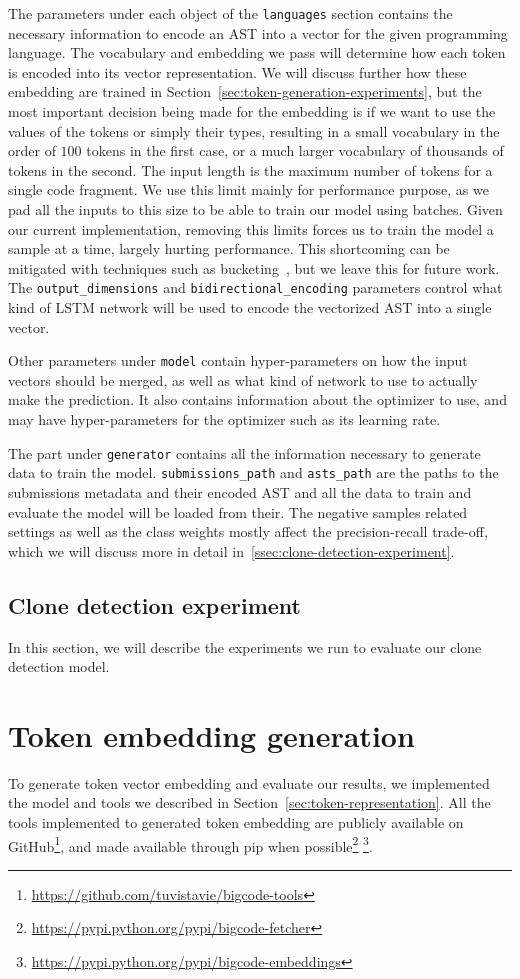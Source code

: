 The parameters under each object of the \lstinline{languages} section contains
the necessary information to encode an AST into a vector for the given
programming language. The vocabulary and embedding we pass will determine how
each token is encoded into its vector representation. We will discuss further
how these embedding are trained in
Section~\ref{sec:token-generation-experiments}, but the most important decision
being made for the embedding is if we want to use the values of the tokens or
simply their types, resulting in a small vocabulary in the order of $100$ tokens
in the first case, or a much larger vocabulary of thousands of tokens in the
second. The input length is the maximum number of tokens for a single code
fragment. We use this limit mainly for performance purpose, as we pad all the
inputs to this size to be able to train our model using batches. Given our
current implementation, removing this limits forces us to train the model a
sample at a time, largely hurting performance. This shortcoming can be mitigated
with techniques such as bucketing~\cite{DBLP:journals/corr/abs-1708-05604}, but
we leave this for future work. The \lstinline{output_dimensions} and
\lstinline{bidirectional_encoding} parameters control what kind of LSTM network
will be used to encode the vectorized AST into a single vector.

Other parameters under \lstinline{model} contain hyper-parameters on how the
input vectors should be merged, as well as what kind of network to use to
actually make the prediction. It also contains information about the optimizer
to use, and may have hyper-parameters for the optimizer such as its learning
rate.

The part under \lstinline{generator} contains all the information necessary to
generate data to train the model. \lstinline{submissions_path} and
\lstinline{asts_path} are the paths to the submissions metadata and their
encoded AST and all the data to train and evaluate the model will be loaded from
their. The negative samples related settings as well as the class weights mostly
affect the precision-recall trade-off, which we will discuss more in detail
in~\ref{ssec:clone-detection-experiment}.
\subsection{\label{ssec:clone-detection-experiment}Clone detection experiment}
In this section, we will describe the experiments we run to evaluate our clone
detection model.
\section{\label{sec:token-generation-experiments}Token embedding generation}
To generate token vector embedding and evaluate our results, we implemented the
model and tools we described in Section~\ref{sec:token-representation}. All the
tools implemented to generated token embedding are publicly available on
GitHub\footnote{\url{https://github.com/tuvistavie/bigcode-tools}}, and made
available through pip when
possible\footnote{\url{https://pypi.python.org/pypi/bigcode-fetcher}}
\footnote{\url{https://pypi.python.org/pypi/bigcode-embeddings}}.
%
